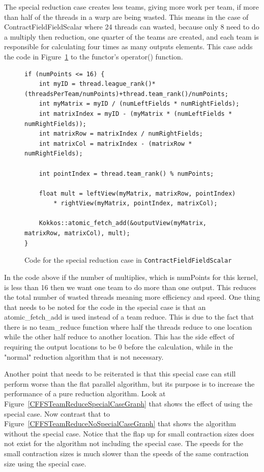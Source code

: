 The special reduction case creates less teams, giving more work per team, if more than half of the threads in a warp are being wasted. This means in the case of ContractFieldFieldScalar where 24 threads can wasted, because only 8 need to do a multiply then reduction, one quarter of the teams are created, and each team is responsible for calculating four times as many outputs elements. This case adds the code in Figure~\ref{lst:ContractFieldFieldScalarReductionSpecialCase} to the functor's operator() function. \\
\begin{figure}[!ht]
    \begin{lstlisting}
if (numPoints <= 16) {	
	int myID = thread.league_rank()*(threadsPerTeam/numPoints)+thread.team_rank()/numPoints;
	int myMatrix = myID / (numLeftFields * numRightFields);
	int matrixIndex = myID - (myMatrix * (numLeftFields * numRightFields));
	int matrixRow = matrixIndex / numRightFields;
	int matrixCol = matrixIndex - (matrixRow * numRightFields);

	int pointIndex = thread.team_rank() % numPoints;

	float mult = leftView(myMatrix, matrixRow, pointIndex) 
		* rightView(myMatrix, pointIndex, matrixCol);

	Kokkos::atomic_fetch_add(&outputView(myMatrix, matrixRow, matrixCol), mult);
}
    \end{lstlisting}
\caption{Code for the special reduction case in \texttt{ContractFieldFieldScalar}
\label{lst:ContractFieldFieldScalarReductionSpecialCase}} 
\end{figure}

In the code above if the number of multiplies, which is numPoints for this kernel, is less than 16 then we want one team to do more than one output. This reduces the total number of wasted threads meaning more efficiency and speed. One thing that needs to be noted for the code in the special case is that an atomic\_fetch\_add is used instead of a team reduce. This is due to the fact that there is no team\_reduce function where half the threads reduce to one location while the other half reduce to another location. This has the side effect of requiring the output locations to be 0 before the calculation, while in the "normal" reduction algorithm that is not necessary. 

Another point that needs to be reiterated is that this special case can still perform worse than the flat parallel algorithm, but its purpose is to increase the performance of a pure reduction algorithm. Look at Figure~\ref{CFFSTeamReduceSpecialCaseGraph} that shows the effect of using the special case. Now contrast that to  Figure~\ref{CFFSTeamReduceNoSpecialCaseGraph} that shows the algorithm without the special case. Notice that the flap up for small contraction sizes does not exist for the algorithm not including the special case. The speeds for the small contraction sizes is much slower than the speeds of the same contraction size using the special case.

